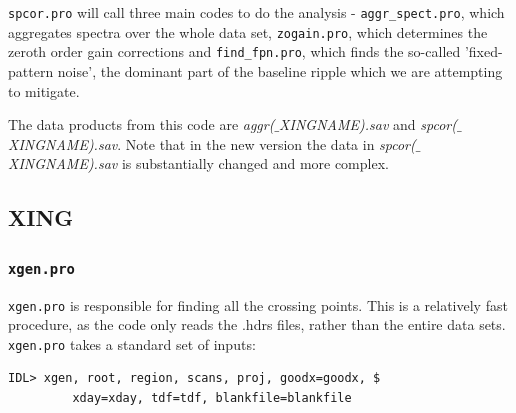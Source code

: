 \documentclass[11pt]{article}
\begin{document}
\texttt{spcor.pro} will call three main codes to do the analysis -  \texttt{aggr\_spect.pro}, which aggregates spectra over the whole data set,  \texttt{zogain.pro}, which determines the zeroth order gain corrections and \texttt{find\_fpn.pro}, which finds the so-called 'fixed-pattern noise', the dominant part of the baseline ripple which we are attempting to mitigate. 

The data products from this code are  {\it aggr($\_$XINGNAME).sav} and {\it spcor($\_$XINGNAME).sav}. Note that in the new version the data in {\it spcor($\_$XINGNAME).sav} is substantially changed and more complex.

\subsection{XING}
\subsubsection{\texttt{xgen.pro}}
 \texttt{xgen.pro} is responsible for finding all the crossing points. This is a relatively fast procedure, as the code only reads the .hdrs files, rather than the entire data sets. \texttt{xgen.pro} takes a standard set of inputs:
\begin{verbatim}
IDL> xgen, root, region, scans, proj, goodx=goodx, $
         xday=xday, tdf=tdf, blankfile=blankfile
\end{verbatim}
\end{document}
